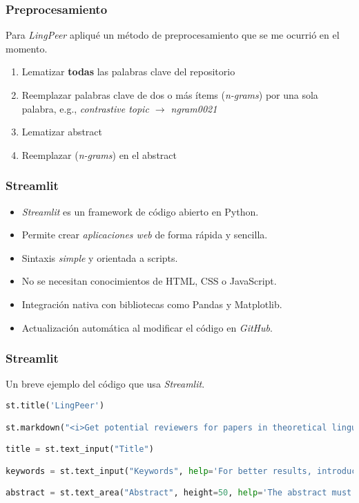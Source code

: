 \documentclass{beamer}
\newcommand{\blue}[1] {{\color{blue} #1}}
\begin{document}
\begin{frame}
\frametitle{Preprocesamiento}

Para \alert{\textit{LingPeer}} apliqué un método de preprocesamiento que se me ocurrió en el momento.

\begin{enumerate}
\item Lematizar \textbf{todas} las palabras clave del repositorio
\item Reemplazar palabras clave de dos o más ítems (\alert{\textit{n-grams}}) por una sola palabra, e.g., \blue{\textit{contrastive topic $\rightarrow$ ngram0021}}
\item Lematizar abstract
\item Reemplazar (\alert{\textit{n-grams}}) en el abstract
\end{enumerate}


\end{frame}


\begin{frame}
\frametitle{Streamlit}

\begin{itemize}
    \item \alert{\textit{Streamlit}} es un framework de código abierto en Python.
    \item Permite crear \alert{\textit{aplicaciones web}} de forma rápida y sencilla.
    \item Sintaxis \alert{\textit{simple}} y orientada a scripts.
    \item No se necesitan conocimientos de HTML, CSS o JavaScript.
    \item Integración nativa con bibliotecas como Pandas y Matplotlib.
    \item Actualización automática al modificar el código en \alert{\textit{GitHub}}.
\end{itemize}
\end{frame}


\begin{frame}[fragile]
\frametitle{Streamlit}

Un breve ejemplo del código que usa \alert{\textit{Streamlit}}.

\begin{lstlisting}[language=Python]
st.title('LingPeer')

st.markdown("<i>Get potential reviewers for papers in theoretical linguistics based on data from [Lingbuzz](https://ling.auf.net)</i>", unsafe_allow_html=True)

title = st.text_input("Title")

keywords = st.text_input("Keywords", help='For better results, introduce at least 3 keywords separated by commas or semicolons')

abstract = st.text_area("Abstract", height=50, help='The abstract must have a maximum lenght of 1000 words')
\end{lstlisting}
\end{frame}
\end{document}
